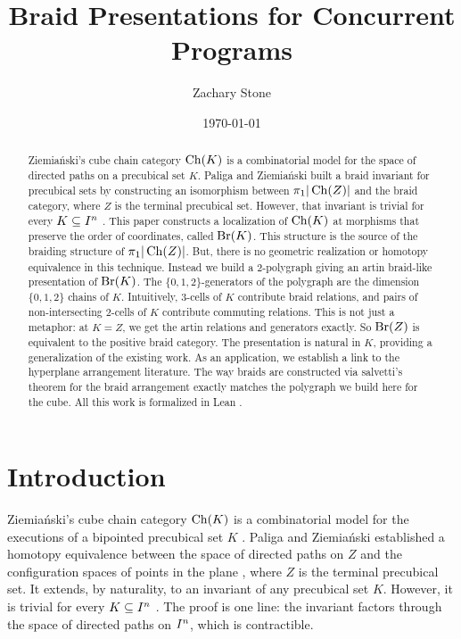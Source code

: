 \documentclass[11pt]{article}
\title{Braid Presentations for Concurrent Programs}
\author{Zachary Stone}
\date{\today}
\begin{document}
\maketitle

\begin{abstract}
Ziemiański's cube chain category $\operatorname{Ch}(K)$ is a combinatorial model for the space of directed paths
on a precubical set $K$. Paliga and Ziemiański built a braid invariant for precubical sets
by constructing an isomorphism between $\pi_1|\operatorname{Ch}(Z)|$ and the braid category, 
where $Z$ is the terminal precubical set.
However, that invariant is trivial for every $K \subseteq I^{n}$ \cite[Prop.~6.1]{PZ}.
This paper constructs a localization of $\operatorname{Ch}(K)$ at morphisms that preserve the order
of coordinates, called $\operatorname{Br}(K)$. This structure is the source of the braiding
structure of $\pi_1|\operatorname{Ch}(Z)|$. But, there is no geometric realization or homotopy equivalence in this technique.
Instead we build a 2-polygraph giving an artin braid-like presentation of
$\operatorname{Br}(K)$. The $\{0,1,2\}$-generators of the polygraph are the dimension $\{0,1,2\}$ chains of $K$.
Intuitively, $3$-cells of $K$ contribute braid relations, and pairs of non-intersecting $2$-cells of
$K$ contribute commuting relations. This is not just a metaphor: at $K = Z$,
we get the artin relations and generators exactly. So $\operatorname{Br}(Z)$ is equivalent to the
positive braid category. The presentation is natural in $K$, providing a generalization of the
existing work. As an application, we establish a link to the hyperplane arrangement literature.
The way braids are constructed via salvetti's theorem for the braid arrangement exactly matches
the polygraph we build here for the cube.
All this work is formalized in Lean \cite{Cubical}.
\end{abstract}

\section{Introduction}\label{sec:intro}

Ziemiański's cube chain category $\operatorname{Ch}(K)$ is a combinatorial model for the executions of a
bipointed precubical set $K$ \cite[Thm.~7.6]{Z2}. Paliga and Ziemiański established a homotopy 
equivalence between the space of directed paths on $Z$ and the configuration spaces of points in
the plane \cite[Thm.~1.1]{PZ}, where $Z$ is the terminal precubical set.
It extends, by naturality, to an invariant of any precubical set $K$.
However, it is trivial for every $K \subseteq I^{n}$ \cite[Prop.~6.1]{PZ}.
The proof is one line: the invariant factors through the space of directed paths on $I^{n}$,
which is contractible.
\end{document}
